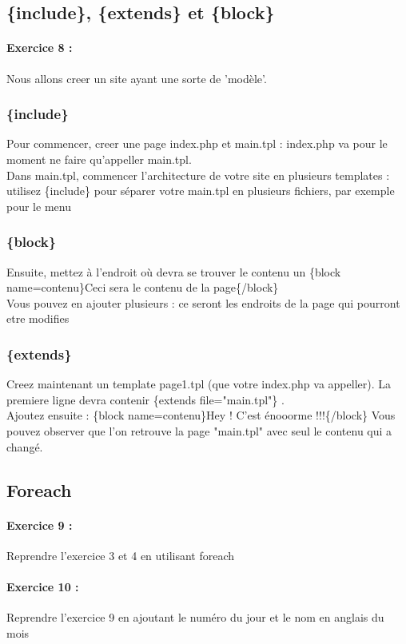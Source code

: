 \documentclass[10pt,a4paper]{article}
\begin{document}
		\subsection{\{include\}, \{extends\} et \{block\}}
			\paragraph{Exercice 8 :} Nous allons creer un site ayant une sorte de 'modèle'. 
			\subsubsection{\{include\}}
				Pour commencer, creer une page index.php et main.tpl : index.php va pour le moment ne faire qu'appeller main.tpl.\\
				Dans main.tpl, commencer l'architecture de votre site en plusieurs templates : utilisez \{include\} pour séparer votre main.tpl en plusieurs fichiers, par exemple pour le menu
			\subsubsection{\{block\}}
				Ensuite, mettez à l'endroit où devra se trouver le contenu un \{block name=contenu\}Ceci sera le contenu de la page\{/block\}\\
				Vous pouvez en ajouter plusieurs : ce seront les endroits de la page qui pourront etre modifies
			\subsubsection{\{extends\}}
				Creez maintenant un template page1.tpl (que votre index.php va appeller).
				La premiere ligne devra contenir \{extends file="main.tpl"\} .\\
				Ajoutez ensuite : \{block name=contenu\}Hey ! C'est énooorme !!!\{/block\}
				Vous pouvez observer que l'on retrouve la page "main.tpl" avec seul le contenu qui a changé.\\
		\subsection{Foreach}
			\paragraph{Exercice 9 :} Reprendre l'exercice 3 et 4 en utilisant foreach
			\paragraph{Exercice 10 :} Reprendre l'exercice 9 en ajoutant le numéro du jour et le nom en anglais du mois
\end{document}
